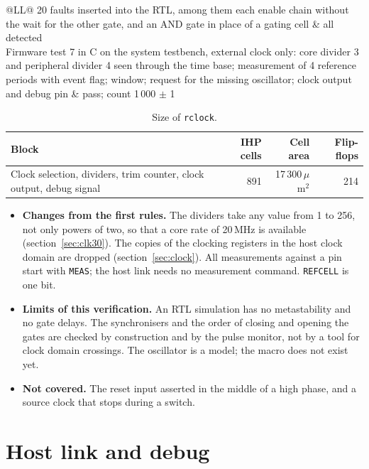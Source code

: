 \documentclass[10pt,a4paper]{article}
\newcommand{\reg}[1]{\texttt{#1}}
\begin{document}
\begin{table}[H]
\begin{tabularx}{\linewidth}{@{}LL@{}}
20 faults inserted into the RTL, among them each enable chain without the wait for the other gate, and an AND gate in place of a gating cell & all detected \\
Firmware test 7 in C on the system testbench, external clock only: core divider 3 and peripheral divider 4 seen through the time base; measurement of 4 reference periods with event flag; window; request for the missing oscillator; clock output and debug pin & pass; count 1\,000 $\pm$ 1 \\
\bottomrule
\end{tabularx}
\caption{Verification of the clocking block.}
\end{table}

\begin{table}[H]
\centering\small
\begin{tabular}{@{}lrrr@{}}
\toprule
Block & IHP cells & Cell area & Flip-flops \\
\midrule
Clock selection, dividers, trim counter, clock output, debug signal & 891 & 17\,300\,$\mu$m$^2$ & 214 \\
\bottomrule
\end{tabular}
\caption{Size of \texttt{rclock}.}
\end{table}

\begin{itemize}
\item \textbf{Changes from the first rules.} The dividers take any value from 1 to 256, not only powers of two,
so that a core rate of 20\,MHz is available (section~\ref{sec:clk30}). The copies of the clocking registers in the host clock domain are dropped
(section~\ref{sec:clock}). All measurements against a pin start with \reg{MEAS}; the host link needs no
measurement command. \reg{REFCELL} is one bit.
\item \textbf{Limits of this verification.} An RTL simulation has no metastability and no gate delays. The
synchronisers and the order of closing and opening the gates are checked by construction and by the pulse
monitor, not by a tool for clock domain crossings. The oscillator is a model; the macro does not exist yet.
\item \textbf{Not covered.} The reset input asserted in the middle of a high phase, and a source clock that stops
during a switch.
\end{itemize}

\section{Host link and debug}\label{sec:host}
\end{document}
